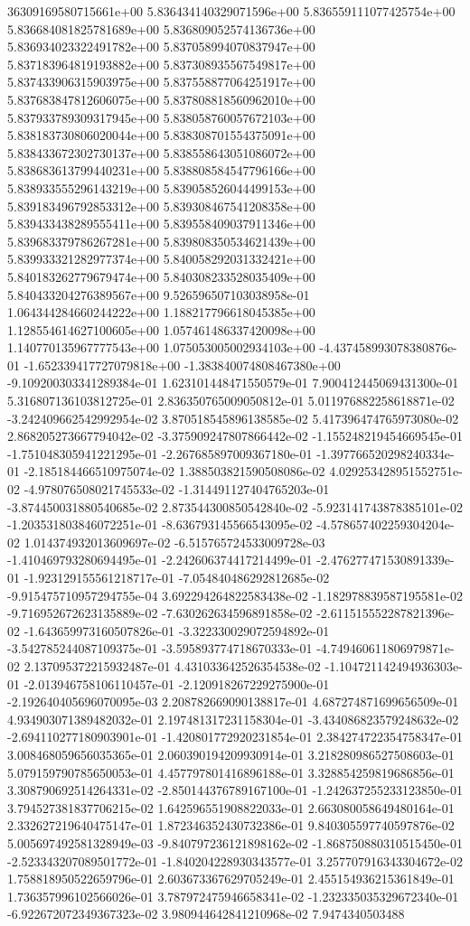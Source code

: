 36309169580715661e+00	5.836434140329071596e+00	5.836559111077425754e+00	5.836684081825781689e+00	5.836809052574136736e+00	5.836934023322491782e+00	5.837058994070837947e+00	5.837183964819193882e+00	5.837308935567549817e+00	5.837433906315903975e+00	5.837558877064251917e+00	5.837683847812606075e+00	5.837808818560962010e+00	5.837933789309317945e+00	5.838058760057672103e+00	5.838183730806020044e+00	5.838308701554375091e+00	5.838433672302730137e+00	5.838558643051086072e+00	5.838683613799440231e+00	5.838808584547796166e+00	5.838933555296143219e+00	5.839058526044499153e+00	5.839183496792853312e+00	5.839308467541208358e+00	5.839433438289555411e+00	5.839558409037911346e+00	5.839683379786267281e+00	5.839808350534621439e+00	5.839933321282977374e+00	5.840058292031332421e+00	5.840183262779679474e+00	5.840308233528035409e+00	5.840433204276389567e+00
9.526596507103038958e-01	1.064344284660244222e+00	1.188217796618045385e+00	1.128554614627100605e+00	1.057461486337420098e+00	1.140770135967777543e+00	1.075053005002934103e+00	-4.437458993078380876e-01	-1.652339417727079818e+00	-1.383840074808467380e+00	-9.109200303341289384e-01	1.623101448471550579e-01	7.900412445069431300e-01	5.316807136103812725e-01	2.836350765009050812e-01	5.011976882258618871e-02	-3.242409662542992954e-02	3.870518545896138585e-02	5.417396474765973080e-02	2.868205273667794042e-02	-3.375909247807866442e-02	-1.155248219454669545e-01	-1.751048305941221295e-01	-2.267685897009367180e-01	-1.397766520298240334e-01	-2.185184466510975074e-02	1.388503821590508086e-02	4.029253428951552751e-02	-4.978076508021745533e-02	-1.314491127404765203e-01	-3.874450031880540685e-02	2.873544300850542840e-02	-5.923141743878385101e-02	-1.203531803846072251e-01	-8.636793145566543095e-02	-4.578657402259304204e-02	1.014374932013609697e-02	-6.515765724533009728e-03	-1.410469793280694495e-01	-2.242606374417214499e-01	-2.476277471530891339e-01	-1.923129155561218717e-01	-7.054840486292812685e-02	-9.915475710957294755e-04	3.692294264822583438e-02	-1.182978839587195581e-02	-9.716952672623135889e-02	-7.630262634596891858e-02	-2.611515552287821396e-02	-1.643659973160507826e-01	-3.322330029072594892e-01	-3.542785244087109375e-01	-3.595893774718670333e-01	-4.749460611806979871e-02	2.137095372215932487e-01	4.431033642526354538e-02	-1.104721142494936303e-01	-2.013946758106110457e-01	-2.120918267229275900e-01	-2.192640405696070095e-03	2.208782669090138817e-01	4.687274871699656509e-01	4.934903071389482032e-01	2.197481317231158304e-01	-3.434086823579248632e-02	-2.694110277180903901e-01	-1.420801772920231854e-01	2.384274722354758347e-01	3.008468059656035365e-01	2.060390194209930914e-01	3.218280986527508603e-01	5.079159790785650053e-01	4.457797801416896188e-01	3.328854259819686856e-01	3.308790692514264331e-02	-2.850144376789167100e-01	-1.242637255233123850e-01	3.794527381837706215e-02	1.642596551908822033e-01	2.663080058649480164e-01	2.332627219640475147e-01	1.872346352430732386e-01	9.840305597740597876e-02	5.005697492581328949e-03	-9.840797236121898162e-02	-1.868750880310515450e-01	-2.523343207089501772e-01	-1.840204228930343577e-01	3.257707916343304672e-02	1.758818950522659796e-01	2.603673367629705249e-01	2.455154936215361849e-01	1.736357996102566026e-01	3.787972475946658341e-02	-1.232335035329672340e-01	-6.922672072349367323e-02	3.980944642841210968e-02	7.9474340503488
